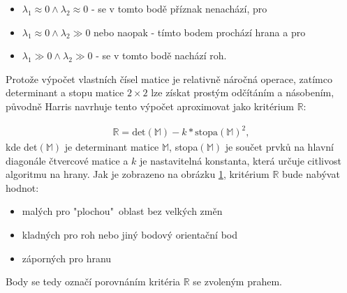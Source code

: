 \begin{itemize}
	\item ${\lambda_1 \approx 0 \wedge \lambda_2 \approx 0}$ - se v tomto bodě příznak nenachází, pro
	\item ${\lambda_1 \approx 0 \wedge \lambda_2 \gg 0}$ nebo naopak - tímto bodem prochází hrana a pro
	\item ${\lambda_1 \gg 0 \wedge \lambda_2 \gg 0}$  - se v tomto bodě nachází roh.
\end{itemize}

Protože výpočet vlastních čísel matice je relativně náročná operace, zatímco determinant a stopu matice $2\times2$ lze získat prostým odčítáním a násobením, původně Harris navrhuje tento výpočet aproximovat jako kritérium $\mathbb{R}$:

\begin{align}
\mathbb{R} = \text{det}(\mathbb{M}) - k * \text{stopa}(\mathbb{M})^2,
\end{align}
kde det$(\mathbb{M})$ je determinant matice $\mathbb{M}$, stopa$(\mathbb{M})$ je součet prvků na hlavní diagonále čtvercové matice a $k$ je nastavitelná konstanta, která určuje citlivost algoritmu na hrany. Jak je zobrazeno na obrázku \ref{Harris_eigen}, kritérium $\mathbb{R}$ bude nabývat hodnot:
\begin{itemize}
	\item malých pro "plochou"\ oblast bez velkých změn
	\item kladných pro roh nebo jiný bodový orientační bod
	\item záporných pro hranu
\end{itemize} 

Body se tedy označí porovnáním kritéria $\mathbb{R}$ se zvoleným prahem.

\begin{figure}[!ht] 
	\label{Harris_eigen}
\end{figure}



